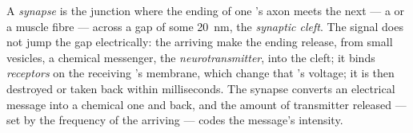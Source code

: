 \begin{definition}\label{def:g12:stretch-reflex:synapse}
A \emph{synapse} is the junction where the ending of
one 's axon meets the next  --- a  or a muscle fibre
--- across a gap of some \qty{20}{nm}, the \emph{synaptic cleft}. The
signal does not jump the gap electrically: the arriving  make the ending release, from small vesicles, a chemical
messenger, the \emph{neurotransmitter}, into
the cleft; it binds \emph{receptors} on the receiving 's membrane,
which change that 's voltage; it is then destroyed or taken back
within milliseconds. The synapse converts an electrical message into
a chemical one and back, and the amount of transmitter released ---
set by the frequency of the arriving  --- codes the
message's intensity.
\end{definition}

